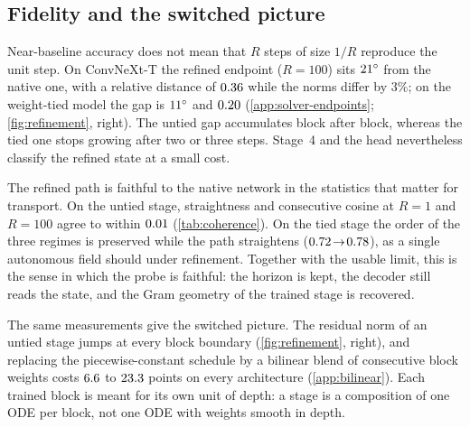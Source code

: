 \subsection{Fidelity and the switched picture}
\label{sec:fidelity}

Near-baseline accuracy does not mean that $R$ steps of size $1/R$ reproduce the unit
step.
On ConvNeXt-T the refined endpoint ($R{=}100$) sits $21^\circ$ from the
native one, with a relative distance of $0.36$ while the norms differ by
$3\%$; on the weight-tied model the gap is $11^\circ$ and $0.20$
(\cref{app:solver-endpoints}; \cref{fig:refinement}, right).
The untied gap accumulates block after block, whereas the tied one stops growing after
two or three steps.
Stage~4 and the head nevertheless classify the refined state at a small cost.

The refined path is faithful to the native network in the statistics that matter for
transport.
On the untied stage, straightness and consecutive cosine at $R{=}1$ and $R{=}100$ agree
to within $0.01$ (\cref{tab:coherence}).
On the tied stage the order of the three regimes is preserved while the path
straightens ($0.72\!\to\!0.78$), as a single autonomous field should under
refinement.
Together with the usable limit, this is the sense in which the probe is faithful: the
horizon is kept, the decoder still reads the state, and the Gram geometry of the
trained stage is recovered.

The same measurements give the switched picture.
The residual norm of an untied stage jumps at every block boundary
(\cref{fig:refinement}, right), and replacing the piecewise-constant schedule by a
bilinear blend of consecutive block weights costs $6.6$ to
$23.3$ points on every architecture (\cref{app:bilinear}).
Each trained block is meant for its own unit of depth: a stage is a composition of one
ODE per block, not one ODE with weights smooth in depth.
